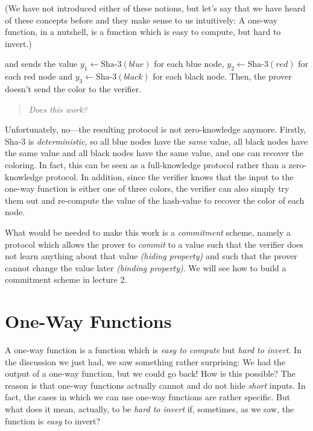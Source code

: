 \documentclass[a4paper,table,dvipsnames]{article}
\theoremstyle{definition}
\begin{document}
\medskip
{\small
(We have not introduced either of these notions, but let's say that we have
heard of these concepts before and they make sense to us intuitively: A one-way function, in a nutshell, is
a function which is easy to compute, but hard to invert.)}

\medskip
and sends the value $y_1\gets \text{Sha-3}(\textit{blue})$ for each blue node,
 $y_2\gets \text{Sha-3}(\textit{red})$ for each red node and $y_3\gets \text{Sha-3}(\textit{black})$ for each black node. Then, the
prover doesn't send
the color to the verifier.
\begin{quote}
\emph{Does this work?}
\end{quote}
Unfortunately, no---the resulting protocol is not zero-knowledge anymore. Firstly, Sha-3 is \emph{deterministic}, so all
blue nodes have the \emph{same} value, all black nodes have the same value and all black nodes have the same value, and one
can recover the coloring. In fact, this can be seen as a full-knowledge protocol rather than a zero-knowledge protocol.
In addition, since the verifier knows that the input to the one-way function is either one of three colors, the verifier
can also simply try them out and re-compute the value of the hash-value to recover the color of each node.

What would be needed to make this work is a \emph{commitment} scheme, namely a protocol which allows the prover to \emph{commit}
to a value such that the verifier does not learn anything about that value \emph{(hiding property)} and such that the prover 
cannot change the value later \emph{(binding property)}. We will see how to build a commitment scheme in lecture 2.


\section{One-Way Functions}
A one-way function is a function which is \emph{easy to compute} but \emph{hard to invert}. In the discussion we just had, we saw
something rather surprising: We had the output of a one-way function, but we could go back! How is this possible? The reason is
that one-way functions actually cannot and do not hide \emph{short} inputs. In fact, the cases in which we can use one-way functions are
rather specific. But what does it mean, actually, to be \emph{hard to invert} if, sometimes, as we saw, the function is \emph{easy}
to invert?
\end{document}
